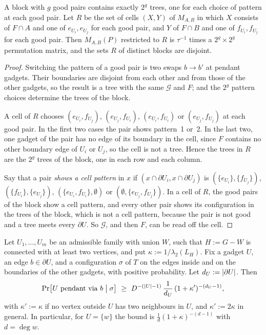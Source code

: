 \begin{lemma}\label{lem:pendant-blocks}
A block with $g$ good pairs contains exactly $2^g$ trees, one for each choice of pattern at each good pair. Let $R$ be the set of cells $(X,Y)$ of $M_{A,B}$ in which $X$ consists of $F\cap A$ and one of $e_{U_i},e_{U_j}$ for each good pair, and $Y$ of $F\cap B$ and one of $f_{U_i},f_{U_j}$ for each good pair. Then $M_{A,B}(P)$ restricted to $R$ is $\tau^{-1}$ times a $2^g\times2^g$ permutation matrix, and the sets $R$ of distinct blocks are disjoint.
\end{lemma}

\begin{proof}
Switching the pattern of a good pair is two swaps $b\to b'$ at pendant gadgets. Their boundaries are disjoint from each other and from those of the other gadgets, so the result is a tree with the same $\mathcal G$ and $F$; and the $2^g$ pattern choices determine the trees of the block.

A cell of $R$ chooses $(e_{U_i},f_{U_j})$, $(e_{U_j},f_{U_i})$, $(e_{U_i},f_{U_i})$ or $(e_{U_j},f_{U_j})$ at each good pair. In the first two cases the pair shows pattern~1 or~2. In the last two, one gadget of the pair has no edge of its boundary in the cell, since $F$ contains no other boundary edge of $U_i$ or $U_j$, so the cell is not a tree. Hence the trees in $R$ are the $2^g$ trees of the block, one in each row and each column.

Say that a pair \emph{shows a cell pattern} in $x$ if $(x\cap\partial U_i,x\cap\partial U_j)$ is $(\{e_{U_i}\},\{f_{U_j}\})$, $(\{f_{U_i}\},\{e_{U_j}\})$, $(\{e_{U_i},f_{U_i}\},\emptyset)$ or $(\emptyset,\{e_{U_j},f_{U_j}\})$. In a cell of $R$, the good pairs of the block show a cell pattern, and every other pair shows its configuration in the trees of the block, which is not a cell pattern, because the pair is not good and a tree meets every $\partial U$. So $\mathcal G$, and then $F$, can be read off the cell.
\end{proof}

\begin{lemma}\label{lem:pendant-prob}
Let $U_1,\dots,U_m$ be an admissible family with union $W$, such that $H:=G-W$ is connected with at least two vertices, and put $\kappa:=1/\lambda_2(L_H)$. Fix a gadget $U$, an edge $b\in\partial U$, and a configuration $\sigma$ of $T$ on the edges inside and on the boundaries of the other gadgets, with positive probability. Let $d_U:=\lvert \partial U\rvert$. Then
\[
  \Pr\bigl[U\text{ pendant via }b\bigm|\sigma\bigr]\ \ge\ D^{-(\lvert U\rvert-1)}\,\frac1{d_U}\,(1+\kappa')^{-(d_U-1)},
\]
with $\kappa':=\kappa$ if no vertex outside $U$ has two neighbours in $U$, and $\kappa':=2\kappa$ in general. In particular, for $U=\{w\}$ the bound is $\frac1d(1+\kappa)^{-(d-1)}$ with $d=\deg w$.
\end{lemma}


